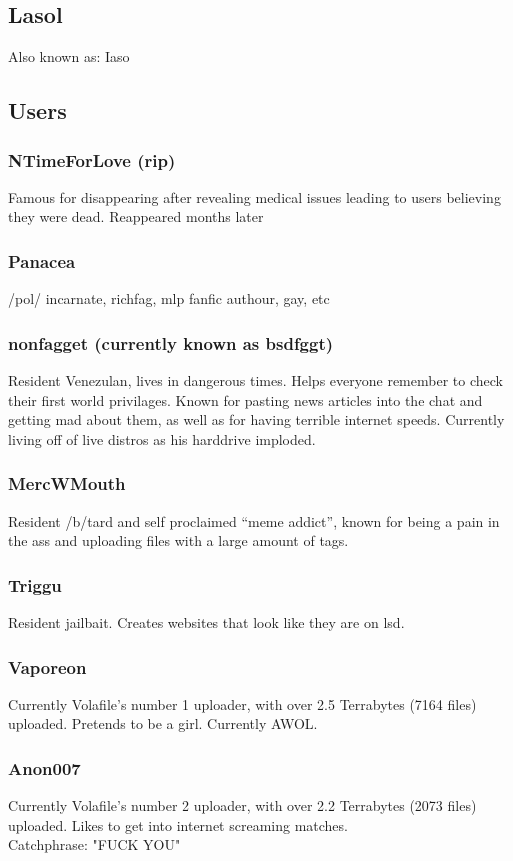 \documentclass[12pt]{report}
\begin{document}
{\subsection{Lasol}
Also known as: Iaso
\vfill
\pagebreak

\subsection{Users}


\subsubsection{NTimeForLove (rip)}
Famous for disappearing after revealing medical issues leading to users believing they were dead. Reappeared months later
\subsubsection{Panacea}
	/pol/ incarnate, richfag, mlp fanfic authour, gay, etc
\subsubsection{nonfagget (currently known as bsdfggt)}
	Resident Venezulan, lives in dangerous times. Helps everyone remember to check their first world privilages. Known for pasting news articles into the chat and getting mad about them, as well as for having terrible internet speeds. Currently living off of live distros as his harddrive imploded.
\subsubsection{MercWMouth}
	Resident /b/tard and self proclaimed ``meme addict'', known for being a pain in the ass and uploading files with a large amount of tags.
\subsubsection{Triggu}
Resident jailbait. Creates websites that look like they are on lsd.
\subsubsection{Vaporeon}
	Currently Volafile's number 1 uploader, with over 2.5 Terrabytes (7164 files) uploaded. Pretends to be a girl. Currently AWOL.
\subsubsection{Anon007}
	Currently Volafile's number 2 uploader, with over 2.2 Terrabytes (2073 files) uploaded. Likes to get into internet screaming matches.\\ Catchphrase: "FUCK YOU"
}
\end{document}

